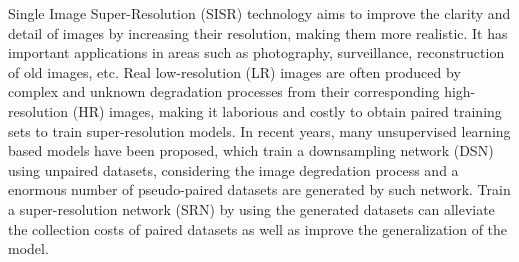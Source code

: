 


Single Image Super-Resolution (SISR) technology aims to improve the clarity and detail of images by increasing their resolution, making them more realistic. It has important applications in areas such as photography, surveillance, reconstruction of old images, etc. Real low-resolution (LR) images are often produced by complex and unknown degradation processes from their corresponding high-resolution (HR) images, making it laborious and costly to obtain paired training sets to train super-resolution models. In recent years, many unsupervised learning based models have been proposed, which train a downsampling network (DSN) using unpaired datasets, considering the image degredation process and a enormous number of pseudo-paired datasets are generated by such network. Train a super-resolution network (SRN) by using the generated datasets can alleviate the collection costs of paired datasets as well as improve the generalization of the model.

